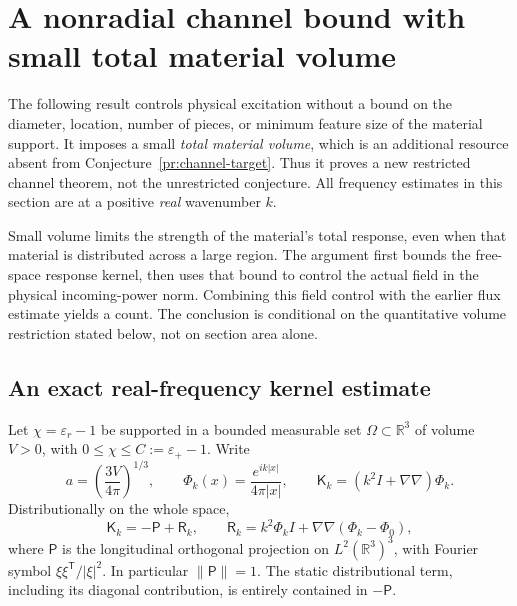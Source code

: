 \section{A nonradial channel bound with small total material volume}
\label{nr:section}

The following result controls physical excitation without a bound on the
diameter, location, number of pieces, or minimum feature size of the material
support. It imposes a small \emph{total material volume}, which is an additional
resource absent from Conjecture~\ref{pr:channel-target}. Thus it proves a new
restricted channel theorem, not the unrestricted conjecture. All frequency
estimates in this section are at a positive \emph{real} wavenumber $k$.

Small volume limits the strength of the material's total response, even when
that material is distributed across a large region. The argument first bounds
the free-space response kernel, then uses that bound to control the actual
field in the physical incoming-power norm. Combining this field control with
the earlier flux estimate yields a count. The conclusion is conditional on
the quantitative volume restriction stated below, not on section area alone.

\subsection{An exact real-frequency kernel estimate}

Let $\chi=\varepsilon_r-1$ be supported in a bounded measurable set
$\Omega\subset\mathbb R^3$ of volume $V>0$, with
$0\leq\chi\leq C:=\varepsilon_+-1$. Write
\begin{equation}
 a=\left(\frac{3V}{4\pi}\right)^{1/3},\qquad
 \Phi_k(x)=\frac{e^{ik|x|}}{4\pi|x|},\qquad
 \mathsf K_k=(k^2 I+\nabla\nabla)\Phi_k.
 \label{nr:setup}
\end{equation}
Distributionally on the whole space,
\begin{equation}
 \mathsf K_k=-\mathsf P+\mathsf R_k,\qquad
 \mathsf R_k=k^2\Phi_k I+\nabla\nabla(\Phi_k-\Phi_0),
 \label{nr:split}
\end{equation}
where $\mathsf P$ is the longitudinal orthogonal projection on
$L^2(\mathbb R^3)^3$, with Fourier symbol
$\xi\xi^{\mathsf T}/|\xi|^2$. In particular $\|\mathsf P\|=1$.
The static distributional term, including its diagonal contribution, is
entirely contained in $-\mathsf P$.

